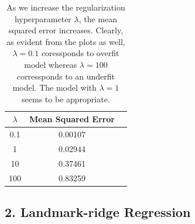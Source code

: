 \documentclass[a4paper,11pt]{article}
\begin{document}
\begin{mlsolution}
\begin{table}[!htbp]
\begin{center}
\begin{tabular}{|c|c|c|}
			\hline
			\hspace{4mm}$\lambda$\hspace{4mm} & \hspace{4mm}\textbf{Mean Squared Error}\hspace{4mm} \\
			\hline
			\hline
			0.1 & 0.00107 \\
			\hline
			1 & 0.02944 \\ 
			\hline
			10 & 0.37461 \\
			\hline
			100 & 0.83259 \\
			\hline
		\end{tabular}
	\end{center}
	\label{tab-1a}
	\caption[MSE for Kernel-ridge]{As we increase the regularization hyperparameter $\lambda$, the mean squared error increases. Clearly, as evident from the plots as well, $\lambda = 0.1$ coressponds to overfit model whereas $\lambda = 100$ corressponds to an underfit model. The model with $\lambda = 1$ seems to be appropriate.}
\end{table}

\subsection{2. Landmark-ridge Regression}


\end{mlsolution}
\end{document}

